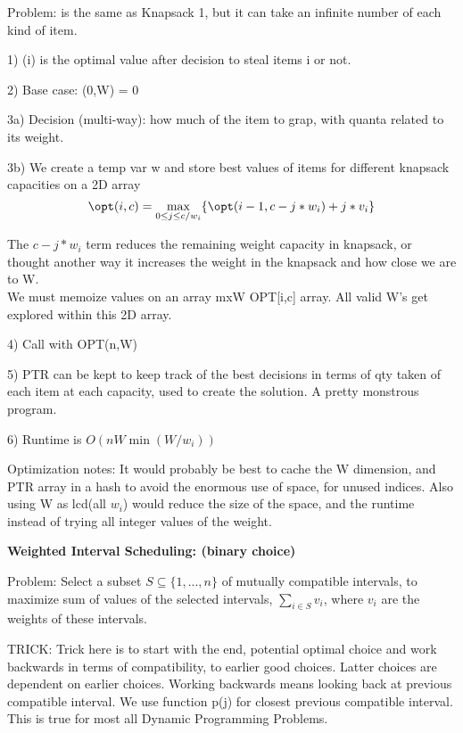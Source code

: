 Problem: is the same as Knapsack 1, but it can take an infinite number of each 
kind of item.

  1) \opt(i) is the optimal value after decision to steal items i or not.

  2) Base case: \opt(0,W) = 0

  3a) Decision (multi-way): how much of the item to grap, with quanta related to its weight.

  3b) We create a temp var w and store best values of items for different knapsack capacities on a 2D array \opt[i,c] 
\begin{equation*}
     \opt(i,c) = \displaystyle \max_{0\le j\le c/w_i} \{\opt(i-1,c-j*w_i) + j*v_i\}
\end{equation*}

The $c - j*w_i$ term reduces the remaining weight capacity in knapsack, or thought 
another way it increases the weight in the knapsack and how close we are to W.\\
We must memoize values on an array mxW OPT[i,c] array.  All valid W's get explored
within this 2D array.

4) Call with OPT(n,W)

5) PTR can be kept to keep track of the best decisions in terms of qty taken of each item
     at each capacity, used to create the solution.  A pretty monstrous program.

6) Runtime is $O(n W \min(W/w_i))$  

Optimization notes: It would probably be best to cache the W dimension, and PTR array
in a hash to avoid the enormous use of space, for unused indices.  Also using W as 
lcd(all $w_i$) would reduce the size of the space, and the runtime instead of trying 
all integer values of the weight.

{\bf Weighted Interval Scheduling: (binary choice)}

Problem: Select a subset $S\subseteq \{1,...,n\}$ of mutually compatible intervals,
to maximize sum of values of the selected intervals, $\displaystyle \sum_{i\in S} v_i$,
where $v_i$ are the weights of these intervals.

TRICK: Trick here is to start with the end, potential optimal choice and work backwards 
in terms of compatibility, to earlier good choices.  Latter choices are dependent on 
earlier choices.  Working backwards means looking back at previous compatible interval.
We use function p(j) for closest previous compatible interval.  This is true for most all 
Dynamic Programming Problems. 

